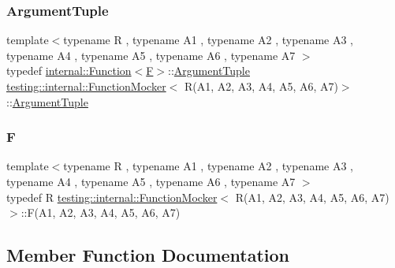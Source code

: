 \subsubsection{\texorpdfstring{ArgumentTuple}{ArgumentTuple}}
{\footnotesize\ttfamily template$<$typename R , typename A1 , typename A2 , typename A3 , typename A4 , typename A5 , typename A6 , typename A7 $>$ \\
typedef \mbox{\hyperlink{structtesting_1_1internal_1_1Function}{internal\+::\+Function}}$<$\mbox{\hyperlink{classtesting_1_1internal_1_1FunctionMocker_3_01R_07A1_00_01A2_00_01A3_00_01A4_00_01A5_00_01A6_00_01A7_08_4_a2ea0e33d9cc0d1f57d58b4aee98c117c}{F}}$>$\+::\mbox{\hyperlink{classtesting_1_1internal_1_1FunctionMocker_3_01R_07A1_00_01A2_00_01A3_00_01A4_00_01A5_00_01A6_00_01A7_08_4_a313911b9c80b57c8c25f0ad5ef2d0bdc}{Argument\+Tuple}} \mbox{\hyperlink{classtesting_1_1internal_1_1FunctionMocker}{testing\+::internal\+::\+Function\+Mocker}}$<$ R(A1, A2, A3, A4, A5, A6, A7)$>$\+::\mbox{\hyperlink{classtesting_1_1internal_1_1FunctionMocker_3_01R_07A1_00_01A2_00_01A3_00_01A4_00_01A5_00_01A6_00_01A7_08_4_a313911b9c80b57c8c25f0ad5ef2d0bdc}{Argument\+Tuple}}}

\mbox{\label{classtesting_1_1internal_1_1FunctionMocker_3_01R_07A1_00_01A2_00_01A3_00_01A4_00_01A5_00_01A6_00_01A7_08_4_a2ea0e33d9cc0d1f57d58b4aee98c117c}} 
\subsubsection{\texorpdfstring{F}{F}}
{\footnotesize\ttfamily template$<$typename R , typename A1 , typename A2 , typename A3 , typename A4 , typename A5 , typename A6 , typename A7 $>$ \\
typedef R \mbox{\hyperlink{classtesting_1_1internal_1_1FunctionMocker}{testing\+::internal\+::\+Function\+Mocker}}$<$ R(A1, A2, A3, A4, A5, A6, A7)$>$\+::F(A1, A2, A3, A4, A5, A6, A7)}



\subsection{Member Function Documentation}
\mbox{\label{classtesting_1_1internal_1_1FunctionMocker_3_01R_07A1_00_01A2_00_01A3_00_01A4_00_01A5_00_01A6_00_01A7_08_4_a9088342f6d93448dba290e565c006979}} 
